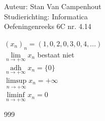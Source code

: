 \documentclass[a4paper]{article}
\begin{document}
  
\noindent \large Auteur: Stan Van Campenhout \\
\noindent \large Studierichting:  Informatica\\
\noindent \large Oefeningenreeks 6C nr. 4.14\\

\medskip

\normalsize

$ (x_n)_n = (1,0,2,0,3,0,4,...) $\\

$ \lim\limits_{n\rightarrow+\infty}x_n $ bestaat niet \\

$\displaystyle \mathop{\mathrm{adh}}\limits_{n \rightarrow +\infty} x_n = \{0\}$\\

$ \limsup\limits_{n\rightarrow+\infty} x_n = +\infty $\\

$ \liminf\limits_{n\rightarrow+\infty} x_n = 0 $\\

\begin{thebibliography}{999}
\end{thebibliography}
\end{document}
